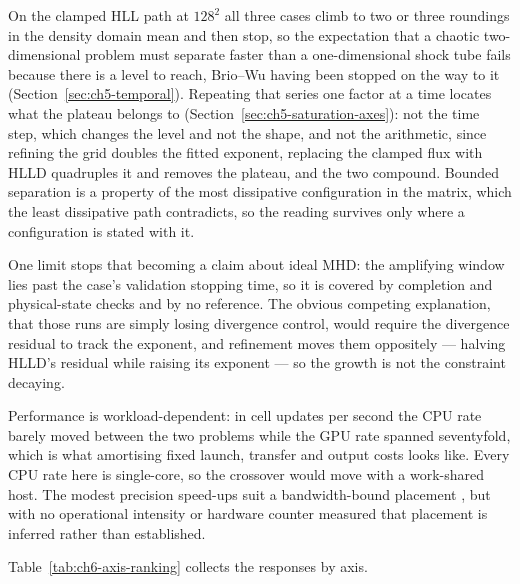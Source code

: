 On the clamped HLL path at $128^2$ all three cases climb to two or three
roundings in the density domain mean and then stop, so the expectation that a
chaotic two-dimensional problem must separate faster than a one-dimensional
shock tube fails because there is a level to reach, Brio--Wu having been stopped
on the way to it (Section~\ref{sec:ch5-temporal}). Repeating that series one
factor at a time locates what the plateau belongs to
(Section~\ref{sec:ch5-saturation-axes}): not the time step, which changes the
level and not the shape, and not the arithmetic, since refining the grid doubles
the fitted exponent, replacing the clamped flux with HLLD quadruples it and
removes the plateau, and the two compound. Bounded separation is a property of
the most dissipative configuration in the matrix, which the least dissipative
path contradicts, so the reading survives only where a configuration is stated
with it.

One limit stops that becoming a claim about ideal MHD: the amplifying window
lies past the case's validation stopping time, so it is covered by completion
and physical-state checks and by no reference. The obvious competing
explanation, that those runs are simply losing divergence control, would require
the divergence residual to track the exponent, and refinement moves them
oppositely --- halving HLLD's residual while raising its exponent --- so the
growth is not the constraint decaying.

Performance is workload-dependent: in cell updates per second the CPU rate
barely moved between the two problems while the GPU rate spanned seventyfold,
which is what amortising fixed launch, transfer and output costs looks like.
Every CPU rate here is single-core, so the crossover would move with a
work-shared host. The modest precision speed-ups suit a bandwidth-bound
placement \citep{williamsEtAl2009roofline}, but with no operational intensity or
hardware counter measured that placement is inferred rather than established.

Table~\ref{tab:ch6-axis-ranking} collects the responses by axis.

